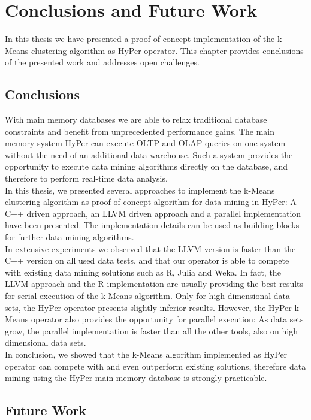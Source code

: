 \chapter{Conclusions and Future Work}\label{chapter:conclusion}
In this thesis we have presented a proof-of-concept implementation of the k-Means clustering algorithm as HyPer operator. This chapter provides conclusions of the presented work and addresses open challenges.

\section{Conclusions}
With main memory databases we are able to relax traditional database constraints and benefit from unprecedented performance gains. The main memory system HyPer can execute OLTP and OLAP queries on one system without the need of an additional data warehouse. Such a system provides the opportunity to execute data mining algorithms directly on the database, and therefore to perform real-time data analysis. 
\\
In this thesis, we presented several approaches to implement the k-Means clustering algorithm as proof-of-concept algorithm for data mining in HyPer: A C++ driven approach, an LLVM driven approach and a parallel implementation have been presented. The implementation details can be used as building blocks for further data mining algorithms.
\\
In extensive experiments we observed that the LLVM version is faster than the C++ version on all used data tests, and that our operator is able to compete with existing data mining solutions such as R, Julia and Weka. In fact, the LLVM approach and the R implementation are usually providing the best results for serial execution of the k-Means algorithm. Only for high dimensional data sets, the HyPer operator presents slightly inferior results. However, the HyPer k-Means operator also provides the opportunity for parallel execution: As data sets grow, the parallel implementation is faster than all the other tools, also on high dimensional data sets.
\\
In conclusion, we showed that the k-Means algorithm implemented as HyPer operator can compete with and even outperform existing solutions, therefore data mining using the HyPer main memory database is strongly practicable.

\section{Future Work}

